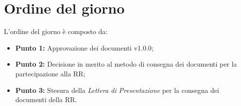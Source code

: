 \section{Ordine del giorno}
L'ordine del giorno è composto da: 
\begin{itemize}
	\item \textbf{Punto 1:} Approvazione dei documenti v1.0.0;
	\item \textbf{Punto 2:} Decisione in merito al metodo di consegna dei documenti per la partecipazione alla RR;
	\item \textbf{Punto 3:} Stesura della \textit{Lettera di Presentazione} per la consegna dei documenti della RR.	
\end{itemize}
